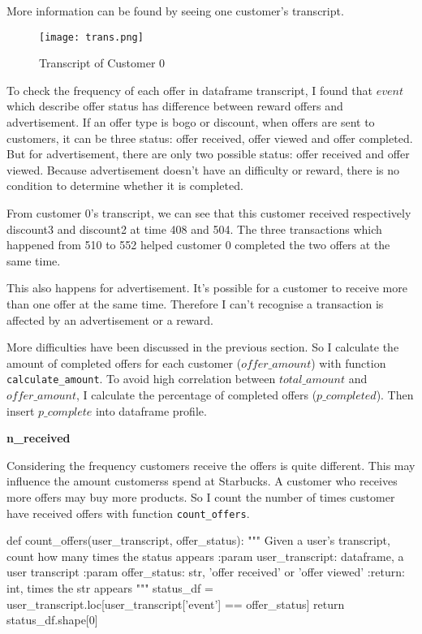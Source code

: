 \documentclass[a4paper,12pt]{article}
\begin{document}
More information can be found by seeing one customer's transcript.

\begin{figure}[H]
    \centering
    \texttt{[image: trans.png]} 
    \caption{Transcript of Customer 0}
\end{figure}

To check the frequency of each offer in dataframe transcript, I found that $event$ which describe offer status has difference 
between reward offers and advertisement. If an offer type is bogo or discount, when offers are sent to customers, it can be 
three status: offer received, offer viewed and offer completed. But for advertisement, there are only two possible status: offer 
received and offer viewed. Because advertisement doesn't have an difficulty or reward, there is no condition to determine 
whether it is completed. 

From customer 0's transcript, we can see that this customer received respectively discount3 and discount2 at time 408 and 504. 
The three transactions which happened from 510 to 552 helped customer 0 completed the two offers at the same time.

This also happens for advertisement. It's possible for a customer to receive more than one offer at the same time. Therefore I 
can't recognise a transaction is affected by an advertisement or a reward.

More difficulties have been discussed in the previous section. So I calculate the amount of completed offers for each customer 
($offer\_amount$) with function \texttt{calculate\_amount}. To avoid high correlation between $total\_amount$ and 
$offer\_amount$, I calculate the percentage of completed offers ($p\_completed$). Then insert $p\_complete$ into dataframe 
profile.

\textbf{n\_received}

Considering the frequency customers receive the offers is quite different. This may influence the amount customerss spend at 
Starbucks. A customer who receives more offers may buy more products. So I count the number of times customer have received 
offers with function \texttt{count\_offers}.

\begin{python}
    def count_offers(user_transcript, offer_status):
        """ Given a user's transcript, count how many times the status appears
        :param user_transcript: dataframe, a user transcript
        :param offer_status: str, 'offer received' or 'offer viewed'
        :return: int, times the str appears
        """
        status_df = user_transcript.loc[user_transcript['event'] == offer_status]
        return status_df.shape[0]
\end{python}
\end{document}
